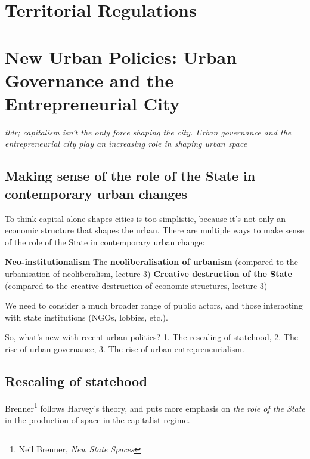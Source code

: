 \documentclass{article}
\begin{document}

\section{Territorial Regulations}

\section{New Urban Policies: Urban Governance and the Entrepreneurial City}

\textit{tldr; capitalism isn't the only force shaping the city. Urban governance and the entrepreneurial city play an increasing role in shaping urban space}

\subsection{Making sense of the role of the State in contemporary urban changes}

To think capital alone shapes cities is too simplistic, because it's not only an economic structure that shapes the urban.
There are multiple ways to make sense of the role of the State in contemporary urban change:

\begin{outline}
	\1 \textbf{Neo-institutionalism}
	\1 The \textbf{neoliberalisation of urbanism} (compared to the urbanisation of neoliberalism,  lecture 3)
	\1 \textbf{Creative destruction of the State} (compared to the creative destruction of economic structures, lecture 3)
\end{outline}

We need to consider a much broader range of public actors, and those interacting with state institutions (NGOs, lobbies, etc.).

So, what's new with recent urban politics? 1. The rescaling of statehood, 2. The rise of urban governance, 3. The rise of urban entrepreneurialism.

\subsection{Rescaling of statehood}

Brenner\footnote{Neil Brenner, \textit{New State Spaces}} follows Harvey's theory, and puts more emphasis on \textit{the role of the State} in the production of space in the capitalist regime.
\end{document}
